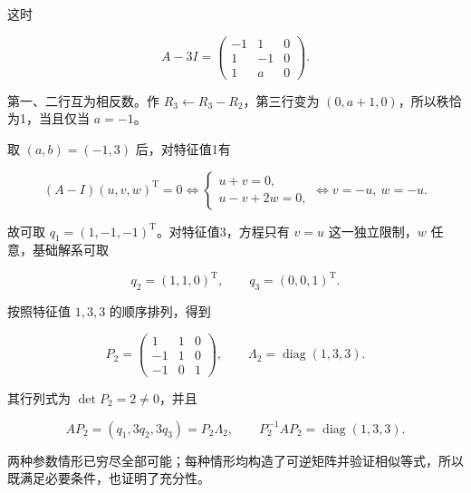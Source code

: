 \documentclass[UTF8,11pt,fontset=windows]{ctexart}
\begin{document}
这时

$$
A-3I=\begin{pmatrix}-1&1&0\\1&-1&0\\1&a&0\end{pmatrix}.
$$

第一、二行互为相反数。作 $R_3\leftarrow R_3-R_2$，第三行变为 $(0,a+1,0)$，所以秩恰为1，当且仅当 $a=-1$。

取 $(a,b)=(-1,3)$ 后，对特征值1有

$$
(A-I)(u,v,w)^{\mathrm T}=0
\iff\begin{cases}u+v=0,\\u-v+2w=0,\end{cases}
\iff v=-u,\ w=-u.
$$

故可取 $q_1=(1,-1,-1)^{\mathrm T}$。对特征值3，方程只有 $v=u$ 这一独立限制，$w$ 任意，基础解系可取

$$
q_2=(1,1,0)^{\mathrm T},\qquad q_3=(0,0,1)^{\mathrm T}.
$$

按照特征值 $1,3,3$ 的顺序排列，得到

$$
\boxed{P_2=\begin{pmatrix}1&1&0\\-1&1&0\\-1&0&1\end{pmatrix}},
\qquad \Lambda_2=\operatorname{diag}(1,3,3).
$$

其行列式为 $\det P_2=2\ne0$，并且

$$
AP_2=(q_1,3q_2,3q_3)=P_2\Lambda_2,
\qquad \boxed{P_2^{-1}AP_2=\operatorname{diag}(1,3,3)}.
$$

两种参数情形已穷尽全部可能；每种情形均构造了可逆矩阵并验证相似等式，所以既满足必要条件，也证明了充分性。
\end{document}
